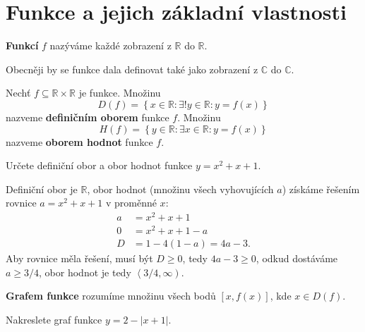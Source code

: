 \section{Funkce a jejich základní vlastnosti}
\begin{definition}
  \textbf{Funkcí} $f$ nazýváme každé zobrazení z $\mathbb R$ do $\mathbb R$.
\end{definition}

\begin{pozn}
  Obecněji by se funkce dala definovat také jako zobrazení z $\mathbb C$ do $\mathbb C$.
\end{pozn}

\begin{definition}
  Nechť $f\subseteq \mathbb R \times \mathbb R$ je funkce. Množinu
  \[
    D(f) = \left  \{ x \in \mathbb R:\exists ! y \in \mathbb R:y=f(x) \right \}
  \]
  nazveme \textbf{definičním oborem} funkce $f$. Množinu
  \[
    H(f) = \left  \{ y \in \mathbb R:\exists  x \in \mathbb R:y=f(x) \right \}
  \]
  nazveme \textbf{oborem hodnot} funkce $f$.
\end{definition}

\begin{priklad}
Určete definiční obor a obor hodnot funkce $y=x^2+x+1.$
\end{priklad}

\begin{reseni}
Definiční obor je $\mathbb R$, obor hodnot (množinu všech vyhovujících $a$)
získáme řešením rovnice $a=x^2+x+1$ v proměnné $x$:
\begin{align*}
	a &= x^2+x+1 \\
	0 &= x^2+x+1-a \\
	D&= 1-4(1-a)=4a-3.
\end{align*}
Aby rovnice měla řešení, musí být $D\geq 0$, tedy $4a-3\geq 0$, odkud dostáváme $a\geq 3/4$,
obor hodnot je tedy $\left < 3/4, \infty \right ). $
\end{reseni}

\begin{pozn}
  \textbf{Grafem funkce} rozumíme množinu všech bodů $[x,f(x)]$, kde $x\in D(f).$
\end{pozn}

\begin{priklad}
Nakreslete graf funkce $y=2-|x+1|.$
\end{priklad}

